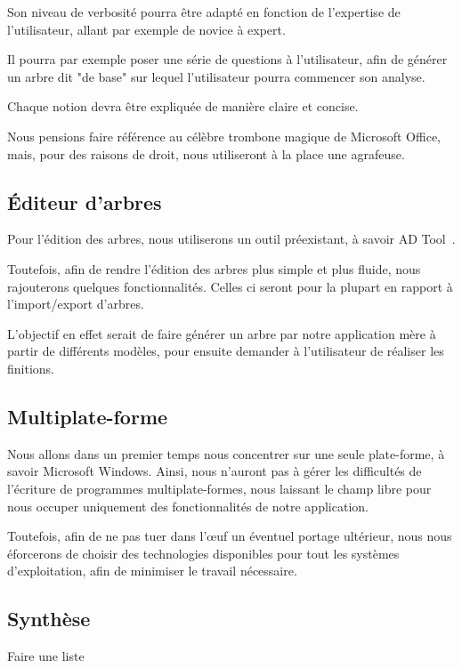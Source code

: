         Son niveau de verbosité pourra être adapté en fonction de l'expertise de l'utilisateur, allant par exemple de novice à expert. %
        
        Il pourra par exemple poser une série de questions à l'utilisateur, afin de générer un arbre dit "de base" sur lequel l'utilisateur pourra commencer son analyse.
        
        Chaque notion devra être expliquée de manière claire et concise.

        Nous pensions faire référence au célèbre trombone magique de Microsoft Office, mais, pour des raisons de droit, nous utiliseront à la place une agrafeuse.
        
    \subsection{\'Editeur d'arbres}
        \label{subsec:edit_arbre}
        Pour l'édition des arbres, nous utiliserons un outil préexistant, à savoir AD Tool~\cite{adtool_paper}.
        
        Toutefois, afin de rendre l'édition des arbres plus simple et plus fluide, nous rajouterons quelques fonctionnalités. Celles ci seront pour la plupart en rapport à l'import/export d'arbres.

        L'objectif en effet serait de faire générer un arbre par notre application mère à partir de différents modèles, pour ensuite demander à l'utilisateur de réaliser les finitions.
    
    \subsection{Multiplate-forme}
        Nous allons dans un premier temps nous concentrer sur une seule plate-forme, à savoir Microsoft Windows. Ainsi, nous n'auront pas à gérer les difficultés de l'écriture de programmes multiplate-formes, nous laissant le champ libre pour nous occuper uniquement des fonctionnalités de notre application.

        Toutefois, afin de ne pas tuer dans l’œuf un éventuel portage ultérieur, nous nous éforcerons de choisir des technologies disponibles pour tout les systèmes d'exploitation, afin de minimiser le travail nécessaire.

    \subsection{Synthèse}
        Faire une liste